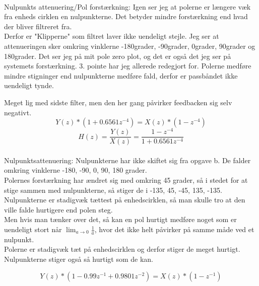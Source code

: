 \begin{Opgaver}
\begin{kapitel}
\begin{Opgave}
\begin{UnderOpgave}[\text{$y[n] = x[n] - x[n - 4] + 0.6561y[n - 4]$}]
                \\
                Nulpunkts attenuering/Pol forstærkning:
                Igen ser jeg at polerne er længere væk fra enheds cirklen en nulpunkterne. Det betyder mindre forstærkning end hvad der bliver filtreret fra. \\
                Derfor er "Klipperne" som filtret laver ikke uendeligt stejle. 
                Jeg ser at attenueringen sker omkring vinklerne -180grader, -90grader, 0grader, 90grader og 180grader. Det ser jeg på mit pole zero plot, og det er også det jeg ser på systemets forstærkning.
                3. pointe har jeg allerede redegjort for. Polerne medføre mindre stigninger end nulpunkterne medføre fald, derfor er passbåndet ikke uendeligt tynde. 
            \end{UnderOpgave}
            \begin{UnderOpgave}[\text{$y[n] = x[n] - x[n - 4] - 0.6561y[n - 4]$}]
                Meget lig med sidste filter, men den her gang påvirker feedbacken sig selv negativt. 
                \[Y(z)*(1 + 0.6561z^{-4}) = X(z) * (1 - z^{-4})\]
                \[H(z) = \frac{Y(z)}{X(z)} = \frac{1 - z^{-4}}{1 + 0.6561z^{-4}}\]
                \\
                Nulpunktsattenuering: 
                Nulpunkterne har ikke skiftet sig fra opgave b. De falder omkring vinklerne -180, -90, 0, 90, 180 grader. \\
                Polernes forstærkning har ændret sig med omkring 45 grader, så i stedet for at stige sammen med nulpunkterne, så stiger de i -135, 45, -45, 135, -135. \\
                Nulpunkterne er stadigvæk tættest på enhedscirklen, så man skulle tro at den ville falde hurtigere end polen steg.\\
                Men hvis man tænker over det, så kan en pol hurtigt medføre noget som er uendeligt stort når $\lim_{a\rightarrow 0} \frac{1}{a}$, hvor det ikke helt påvirker på samme måde ved et nulpunkt. \\
                Polerne er stadigvæk tæt på enhedscirklen og derfor stiger de meget hurtigt. 
                Nulpunkterne stiger også så hurtigt som de kan.                 
            \end{UnderOpgave}
            \begin{UnderOpgave}[\text{$y[n] = x[n] - x[n - 1] + 0.99y[n - 1] - 0.9801y[n - 2]$}]
                \[Y(z) * (1  - 0.99z^{-1} + 0.9801z^{-2}) = X(z)*(1 - z^{-1})\]

\end{UnderOpgave}
\end{Opgave}
\end{kapitel}
\end{Opgaver}
